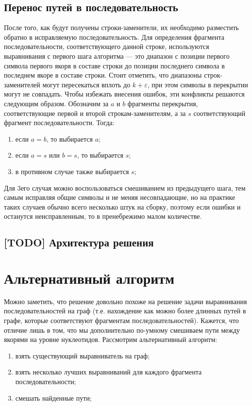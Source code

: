 \documentclass[14pt]{matmex-diploma-custom}
\begin{document}
\subsection{Перенос путей в последовательность}
После того, как будут получены строки-заменители, их необходимо разместить обратно в исправляемую последовательность. Для определения фрагмента последовательности, соответствующего данной строке, используются выравнивания с первого шага алгоритма --- это диапазон с позиции первого символа первого якоря в составе строки до позиции последнего символа в последнем якоре в составе строки. Стоит отметить, что диапазоны строк-заменителей могут пересекаться вплоть до $k+\varepsilon$, при этом символы в перекрытии могут не совпадать. Чтобы избежать внесения ошибок, эти конфликты решаются следующим образом. Обозначим за $a$ и $b$ фрагменты перекрытия, соответствующие первой и второй строкам-заменителям, а за $s$ соответствующий фрагмент последовательности. Тогда:
\begin{enumerate}
    \item если $a=b$, то выбирается $a$;
    \item если $a=s$ или $b=s$, то выбирается $s$;
    \item в противном случае также выбирается $s$;
\end{enumerate}
Для 3его случая можно воспользоваться смешиванием из предыдущего шага, тем самым исправляя общие символы и не меняя несовпадающие, но на практике таких случаев обычно всего несколько штук на сборку, поэтому если ошибки и останутся неисправленным, то в пренебрежимо малом количестве.

\subsection{[TODO] Архитектура решения}


\section{Альтернативный алгоритм}
Можно заметить, что решение довольно похоже на решение задачи выравнивания последовательностей на граф (т.е. нахождение как можно более длинных путей в графе, которые соответствуют фрагментам последовательностей). Кажется, что отличие лишь в том, что мы дополнительно по-умному смешиваем пути между якорями на уровне нуклеотидов. Рассмотрим альтернативный алгоритм:
\begin{enumerate}
    \item взять существующий выравниватель на граф;
    \item взять несколько лучших выравниваний для каждого фрагмента последовательности;
    \item смешать найденные пути;
\end{enumerate}
\end{document}
